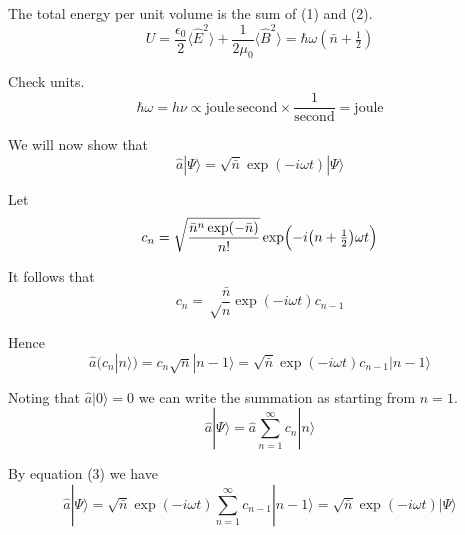 \documentclass[12pt]{article}
\begin{document}
The total energy per unit volume is the sum of (1) and (2).
\begin{equation*}
U=\frac{\epsilon_0}{2}\langle\hat E^2\rangle
+\frac{1}{2\mu_0}\langle\hat B^2\rangle
=\hbar\omega\left(\bar n+\tfrac{1}{2}\right)
\end{equation*}

Check units.
\begin{equation*}
\hbar\omega=h\nu\propto\text{joule}\,\text{second}\times\frac{1}{\text{second}}=\text{joule}
\end{equation*}

\newpage

We will now show that
\begin{equation*}
\hat a|\Psi\rangle=\sqrt{\bar n}\exp(-i\omega t)|\Psi\rangle
\end{equation*}

Let
\begin{equation*}
c_n=\sqrt{\frac{\bar n^n\exp(-\bar n)}{n!}}
\exp\Bigl(-i\bigl(n+\tfrac{1}{2}\bigr)\omega t\Bigr)
\end{equation*}

It follows that
\begin{equation*}
c_n=\sqrt\frac{\bar n}{n}\exp(-i\omega t)c_{n-1}
\end{equation*}

Hence
\begin{equation*}
\hat a\big(c_n|n\rangle\big)=c_n\sqrt{n}|n-1\rangle=\sqrt{\bar n}\exp(-i\omega t)c_{n-1}|n-1\rangle
\tag{3}
\end{equation*}

Noting that $\hat a|0\rangle=0$ we can write the summation as starting from $n=1$.
\begin{equation*}
\hat a|\Psi\rangle=\hat a\sum_{n=1}^\infty c_n|n\rangle
\end{equation*}

By equation (3) we have
\begin{equation*}
\hat a|\Psi\rangle=\sqrt{\bar n}\exp(-i\omega t)\sum_{n=1}^\infty c_{n-1}|n-1\rangle
=\sqrt{\bar n}\exp(-i\omega t)|\Psi\rangle
\end{equation*}
\end{document}
